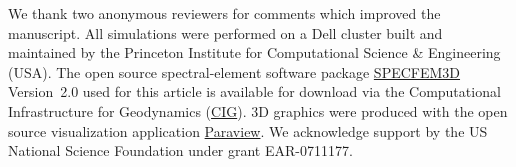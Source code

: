 \documentclass[referee,extra]{gji}
\begin{document}
\begin{acknowledgments}
We thank two anonymous reviewers for comments which improved the manuscript.
All simulations were performed on a Dell cluster built and maintained by the
Princeton Institute for Computational Science \& Engineering (USA).
The open source spectral-element software package \href{http://www.geodynamics.org/cig/software/specfem3d}{SPECFEM3D} Version~2.0 used
for this article is available for download via the Computational Infrastructure for Geodynamics
(\href{http://geodynamics.org/}{CIG}).
3D graphics were produced with the open source visualization application \href{http://www.paraview.org/}{Paraview}.
We acknowledge support by the US National Science Foundation under grant EAR-0711177.
\end{acknowledgments}



\end{document}
